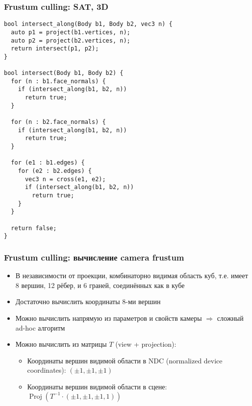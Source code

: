 \documentclass{beamer}
\begin{document}
\begin{frame}[fragile]
\fontsize{8pt}{8pt}
\frametitle{Frustum culling: SAT, 3D}
\begin{verbatim}
bool intersect_along(Body b1, Body b2, vec3 n) {
  auto p1 = project(b1.vertices, n);
  auto p2 = project(b2.vertices, n);
  return intersect(p1, p2);
}

bool intersect(Body b1, Body b2) {
  for (n : b1.face_normals) {
    if (intersect_along(b1, b2, n))
      return true;
  }

  for (n : b2.face_normals) {
    if (intersect_along(b1, b2, n))
      return true;
  }

  for (e1 : b1.edges) {
    for (e2 : b2.edges) {
      vec3 n = cross(e1, e2);
      if (intersect_along(b1, b2, n))
        return true;
    }
  }

  return false;
}
\end{verbatim}
\end{frame}

\begin{frame}[fragile]
\frametitle{Frustum culling: вычисление camera frustum}
\begin{itemize}
\item В независимости от проекции, комбинаторно видимая область \textendash{} куб, т.е. имеет 8 вершин, 12 рёбер, и 6 граней, соединённых как в кубе
\pause
\item Достаточно вычислить координаты 8-ми вершин
\pause
\item Можно вычислить напрямую из параметров и свойств камеры \begin{math}\Rightarrow\end{math} сложный ad-hoc алгоритм
\pause
\item Можно вычислить из матрицы \begin{math}T\end{math} (view + projection):
\pause
\begin{itemize}
\item Координаты вершин видимой области в NDC (normalized device coordinates): \begin{math}(\pm 1, \pm 1, \pm 1)\end{math}
\pause
\item Координаты вершин видимой области в сцене: \begin{math}\operatorname{Proj}\left(T^{-1} \cdot (\pm 1, \pm 1, \pm 1, 1)\right)\end{math}
\end{itemize}
\end{itemize}
\end{frame}
\end{document}
